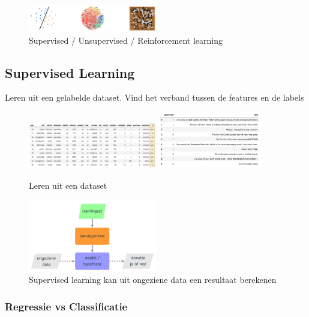 \documentclass{article}
\begin{document}
\begin{figure}[H]
    \centering
    \includegraphics[width=0.5\textwidth]{leeralgoritmes.png}
    \caption{Supervised / Unsupervised / Reinforcement learning}
\end{figure}


\subsection{Supervised Learning}

Leren uit een gelabelde dataset. Vind het verband tussen de features en de labels

\begin{figure}[H]
    \centering
    \includegraphics[width=0.5\textwidth]{supervised-learning.png}
    \includegraphics[width=0.4\textwidth]{supervised-learning2.png}
    \caption{Leren uit een dataset}
\end{figure}

\begin{figure}[H]
    \centering
    \includegraphics[width=0.5\textwidth]{supervised-learning3.png}
    \caption{Supervised learning kan uit ongeziene data een resultaat berekenen}
\end{figure}

\subsubsection{Regressie vs Classificatie}
\end{document}
